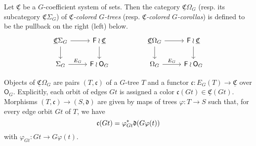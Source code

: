 \documentclass[a4paper,10pt
,draft
]{article}%
\renewcommand{\phi}{\varphi}
\newcommand{\UC}{\underline{\mathfrak C}}
\renewcommand{\1}{\ensuremath{\mathbb{id}}}
\begin{document}
\begin{definition}
      Let $\underline{\mathfrak C}$ be a $G$-coefficient system of sets.
      Then the category $\underline{\mathfrak C}\Omega_G$ (resp. its subcategory $\UC \Sigma_G$)
      of \textit{$\underline{\mathfrak C}$-colored $G$-trees}
      (resp. \textit{$\UC$-colored $G$-corollas})
      is defined to be the pullback on the right (left) below.
      \begin{equation}
            \label{COMEGAG_OG_EQ}
            \begin{tikzcd}
                  \UC \Sigma_G \arrow[d] \arrow[r]
                  &
                  \mathsf F \wr \UC \arrow[d]
                  &&
                  \UC \Omega_G \arrow[d] \arrow[r]
                  &
                  \mathsf F \wr \underline{\mathfrak C} \arrow[d]
                  \\
                  \Sigma_G \arrow[r, "E_G"]
                  &
                  \mathsf F \wr \mathsf O_G
                  &&
                  \Omega_G \arrow[r, "E_G"]
                  &
                  \mathsf F \wr \mathsf O_G
            \end{tikzcd}
      \end{equation}
\end{definition}

Objects of $\UC \Omega_G$ are pairs $(T, \mathfrak c)$ of
a $G$-tree $T$ and
a functor $\mathfrak c: E_G(T) \to \underline{\mathfrak C}$ over $\mathsf O_G$.
Explicitly, each orbit of edges $G t$ %
is assigned a color $\mathfrak c(G t) \in \underline{\mathfrak C}(G t)$. %
Morphisms $(T, \mathfrak c) \to (S, \mathfrak d)$ 
are given by maps of trees $\phi: T \to S$ such that, for every edge orbit $G t$ of $T$, we have
\begin{equation}
      \mathfrak c(G t) = \phi_{G t}^{\**} \mathfrak d(G \phi(t))
\end{equation}
with $\phi_{G t}: G t \to G \phi(t)$.
\end{document}
